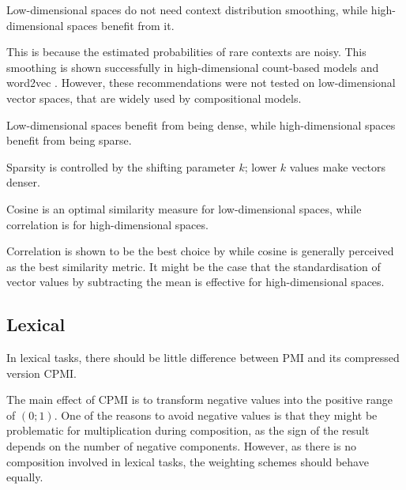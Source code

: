 \begin{hyp}
  \label{hyp:cds}
  Low-dimensional spaces do not need context distribution smoothing, while high-dimensional spaces benefit from it.
\end{hyp}

This is because the estimated probabilities of rare contexts are noisy. This smoothing is shown successfully in high-dimensional count-based models \cite{TACL570} and word2vec \cite{mikolov2013efficient}. However, these recommendations were not tested on low-dimensional vector spaces, that are widely used by compositional models. 

\begin{hyp}
  \label{hyp:neg}
  Low-dimensional spaces benefit from being dense, while high-dimensional spaces benefit from being sparse.
\end{hyp}

Sparsity is controlled by the shifting parameter $k$; lower $k$ values make vectors denser.

\begin{hyp}
  \label{hyp:similarity}
  Cosine is an optimal similarity measure for low-dimensional spaces, while correlation is for high-dimensional spaces.
\end{hyp}

Correlation is shown to be the best choice by \citet{kiela-clark:2014:CVSC} while cosine is generally perceived as the best similarity metric. It might be the case that the standardisation of vector values by subtracting the mean is effective for high-dimensional spaces.

\subsection{Lexical}
\label{sec:elab-hypoth-lexical}

\begin{hyp}
  \label{hyp:lex-pmi-cpmi}
  In lexical tasks, there should be little difference between PMI and its compressed version CPMI.
\end{hyp}

The main effect of CPMI is to transform negative values into the positive range of $(0; 1)$. One of the reasons to avoid negative values is that they might be problematic for multiplication during composition, as the sign of the result depends on the number of negative components. However, as there is no composition involved in lexical tasks, the weighting schemes should behave equally.

